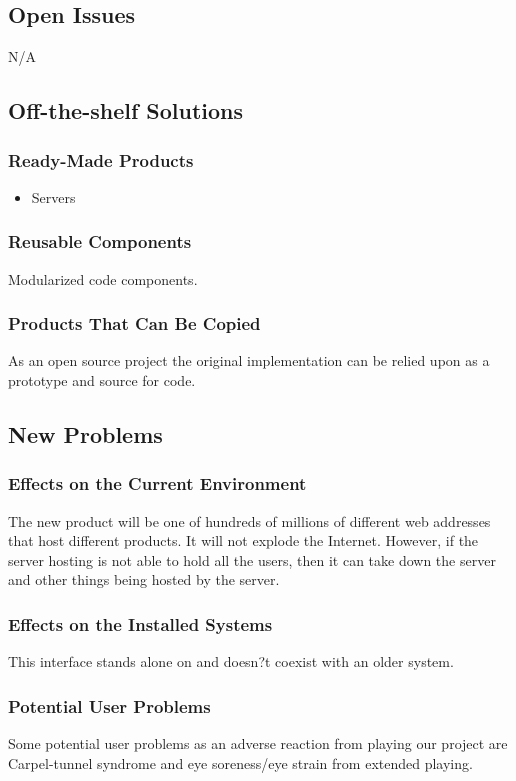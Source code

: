 \documentclass[11pt, oneside]{article}   	%
\begin{document}
\subsection*{Open Issues}
N/A


\subsection*{Off-the-shelf Solutions}
\subsubsection*{Ready-Made Products}
\begin{itemize}
\item Servers
\end{itemize}


\subsubsection*{Reusable Components}
Modularized code components.


\subsubsection*{Products That Can Be Copied}
As an open source project the original implementation can be relied upon as a prototype and source for code.


\subsection*{New Problems}
\subsubsection*{Effects on the Current Environment}
The new product will be one of hundreds of millions of different web addresses that host different products. It will not explode the Internet. However, if the server hosting is not able to hold all the users, then it can take down the server and other things being hosted by the server.


\subsubsection*{Effects on the Installed Systems}
This interface stands alone on and doesn?t coexist with an older system.


\subsubsection*{Potential User Problems}
Some potential user problems as an adverse reaction from playing our project are Carpel-tunnel syndrome and eye soreness/eye strain from extended playing.
\end{document}
